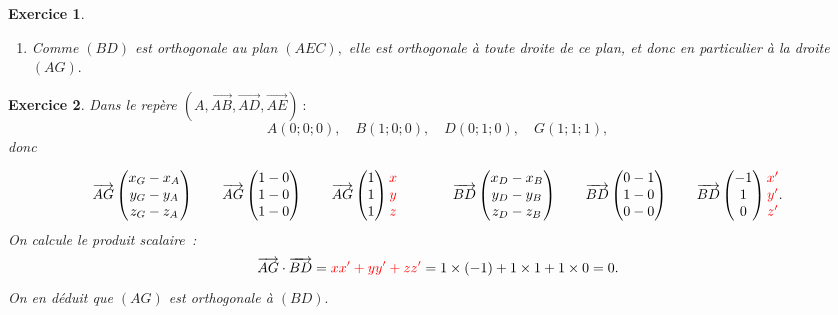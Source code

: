 \documentclass[10pt]{article}
\newtheorem{exo}{Exercice}
\begin{document}
\begin{exo}
\begin{enumerate}
Conclusion~: $(BD)$ est orthogonale à deux droites sécantes du plan $(AEC),$ donc elle est orthogonale au plan $(AEC).$
\item Comme $(BD)$ est orthogonale au plan $(AEC),$ elle est orthogonale à toute droite de ce plan, et donc en particulier à la droite $(AG).$
\end{enumerate}



\end{exo}

\begin{exo}

Dans le repère $\left(A,\overrightarrow{AB},\overrightarrow{AD},\overrightarrow{AE}\right)~:$ \[A(0;0;0),\quad B(1;0;0),\quad D(0;1;0),\quad G(1;1;1),\] donc

\[\overrightarrow{AG}\begin{pmatrix} x_G-x_A\\y_G-y_A\\z_G-z_A \end{pmatrix}\qquad
\overrightarrow{AG}\begin{pmatrix} 1-0\\1-0\\1-0\end{pmatrix}\qquad \overrightarrow{AG}\begin{pmatrix} 1
\\1\\1 \end{pmatrix}\begin{matrix}\textcolor{red}{x}\\\textcolor{red}{y}\\\textcolor{red}{z}\end{matrix} \qquad\qquad \overrightarrow{BD}\begin{pmatrix} x_D-x_B\\y_D-y_B\\z_D-z_B \end{pmatrix}\qquad
\overrightarrow{BD}\begin{pmatrix} 0-1\\1-0\\0-0\end{pmatrix}\qquad \overrightarrow{BD}\begin{pmatrix} -1
\\1\\0 \end{pmatrix}\begin{matrix}\textcolor{red}{x'}\\\textcolor{red}{y'}\\\textcolor{red}{z'}\end{matrix}.\]
On calcule le produit scalaire~:
\[\overrightarrow{AG}\cdot \overrightarrow{BD}=\textcolor{red}{xx'+yy'+zz'}=1\times (-1)+1\times 1+1\times 0=0.\] On en déduit que $(AG)$ est orthogonale à $(BD).$

\end{exo}
\end{document}
